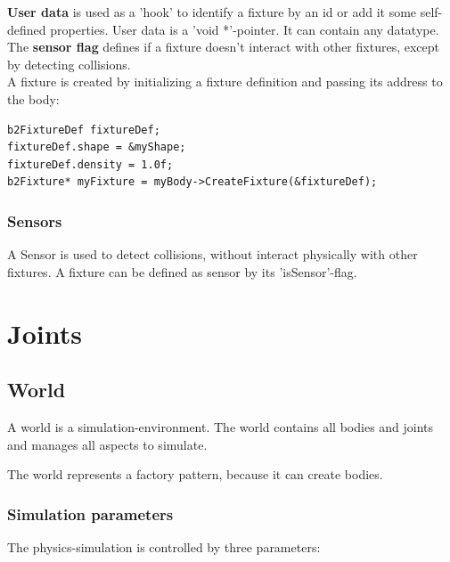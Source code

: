 \documentclass[10pt,a4paper,DIV=11]{scrreprt}
\begin{document}
\textbf{User data} is used as a 'hook' to identify a fixture by an id or add it some self-defined properties. User data is a 'void *'-pointer. It can contain any datatype. \\

The \textbf{sensor flag} defines if a fixture doesn't interact with other fixtures, except by detecting collisions. \\



A fixture is created by initializing a fixture definition and passing its address to the body:

\begin{lstlisting}[caption={Creation of a fixture (source Box2D manual)},label=lst:fixture-create]
b2FixtureDef fixtureDef;
fixtureDef.shape = &myShape;
fixtureDef.density = 1.0f;
b2Fixture* myFixture = myBody->CreateFixture(&fixtureDef);
\end{lstlisting}


\subsubsection*{Sensors}
A Sensor is used to detect collisions, without interact physically with other fixtures. A fixture can be defined as sensor by its 'isSensor'-flag.

\section{Joints}


\subsection{World}
A world is a simulation-environment. The world contains all bodies and joints and manages all aspects to simulate.

The world represents a factory pattern, because it can create bodies.

\subsubsection*{Simulation parameters}
The physics-simulation is controlled by three parameters: \\

   \\
\\
\end{document}
